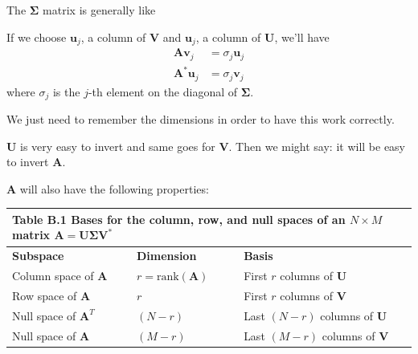 \documentclass[a4paper, 12pt]{book}
\begin{document}
The $\mathbf{\Sigma}$ matrix is generally like

\begin{center}
\end{center}



If we choose $\mathbf{u}_j$, a column of $\mathbf{V}$ and $\mathbf{u}_j$, a column of $\mathbf{U}$, we'll have
\begin{align*}
\mathbf{A}\mathbf{v}_j &= \sigma_j \mathbf{u}_j \\
\mathbf{A}^*\mathbf{u}_j &= \sigma_j \mathbf{v}_j
\end{align*}
where $\sigma_j$ is the $j$-th element on the diagonal of $\mathbf{\Sigma}$.

We just need to remember the dimensions in order to have this work correctly.

\noindent{}

$\mathbf{U}$ is very easy to invert and same goes for $\mathbf{V}$. Then we might say: it will be easy to invert $\mathbf{A}$.

$\mathbf{A}$ will also have the following properties:

\begin{center}
\begin{tabular}{lll}
    \toprule
    \multicolumn{3}{l}{\textbf{Table B.1} Bases for the column, row, and null spaces of an $N \times M$ matrix $\mathbf{A} = \mathbf{U \Sigma V}^*$} \\
    \midrule
    \textbf{Subspace} & \textbf{Dimension} & \textbf{Basis} \\
    \midrule
    Column space of $\mathbf{A}$ & $r = \text{rank}(\mathbf{A})$ & First $r$ columns of $\mathbf{U}$ \\
    Row space of $\mathbf{A}$ & $r$ & First $r$ columns of $\mathbf{V}$ \\
    Null space of $\mathbf{A}^T$ & $(N-r)$ & Last $(N-r)$ columns of $\mathbf{U}$ \\
    Null space of $\mathbf{A}$ & $(M-r)$ & Last $(M-r)$ columns of $\mathbf{V}$ \\
    \bottomrule
\end{tabular}
\end{center}
\end{document}
